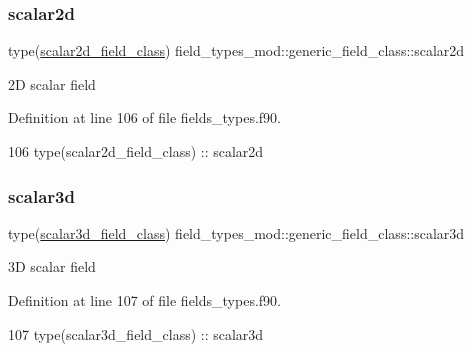 \subsubsection{\texorpdfstring{scalar2d}{scalar2d}}
{\footnotesize\ttfamily type(\mbox{\hyperlink{structfield__types__mod_1_1scalar2d__field__class}{scalar2d\+\_\+field\+\_\+class}}) field\+\_\+types\+\_\+mod\+::generic\+\_\+field\+\_\+class\+::scalar2d\hspace{0.3cm}{\ttfamily [private]}}



2D scalar field 



Definition at line 106 of file fields\+\_\+types.\+f90.


\begin{DoxyCode}
106         \textcolor{keywordtype}{type}(scalar2d\_field\_class) :: scalar2d
\end{DoxyCode}
\mbox{\label{structfield__types__mod_1_1generic__field__class_af45704b3cbbf0877a4f4f8cba1733a20}} 
\subsubsection{\texorpdfstring{scalar3d}{scalar3d}}
{\footnotesize\ttfamily type(\mbox{\hyperlink{structfield__types__mod_1_1scalar3d__field__class}{scalar3d\+\_\+field\+\_\+class}}) field\+\_\+types\+\_\+mod\+::generic\+\_\+field\+\_\+class\+::scalar3d\hspace{0.3cm}{\ttfamily [private]}}



3D scalar field 



Definition at line 107 of file fields\+\_\+types.\+f90.


\begin{DoxyCode}
107         \textcolor{keywordtype}{type}(scalar3d\_field\_class) :: scalar3d
\end{DoxyCode}
\mbox{\label{structfield__types__mod_1_1generic__field__class_a699e81600f0d0261f0da0e986be51a40}} 

